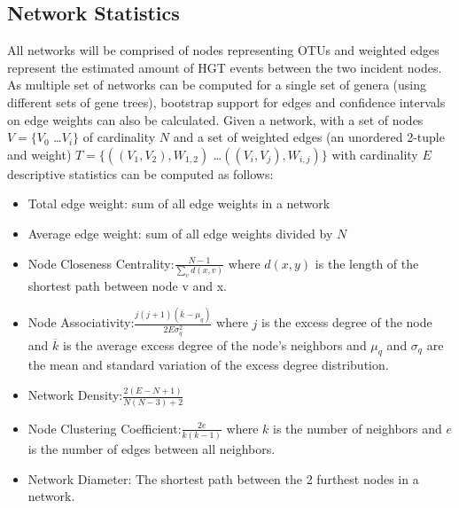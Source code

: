 \documentclass[12pt,letter]{article}
\begin{document}
\subsection{Network Statistics}
All networks will be comprised of nodes representing OTUs and weighted edges represent the estimated amount of HGT events between the two incident nodes.
As multiple set of networks can be computed for a single set of genera (using different sets of gene trees), bootstrap support for edges and confidence intervals on edge weights can also be calculated.
Given a network, with a set of nodes $V = \{V_0$ \dots $V_i\}$ of cardinality $N$ and a set of weighted edges (an unordered 2-tuple and weight) $T = \{((V_1,V_2),W_{1,2})$ \dots $((V_i,V_j),W_{i,j})\}$ with cardinality $E$ descriptive statistics can be computed as follows:
\begin{itemize}
    \item Total edge weight: sum of all edge weights in a network
    \item Average edge weight: sum of all edge weights divided by $N$
    \item Node Closeness Centrality:$ \frac{N-1}{\sum_v d(x,v)}$ where $d(x,y)$ is the length of the shortest path between node v and x.
    \item Node Associativity:$ \frac{j(j+1)(\overline{k}-\mu_q)}{2E\sigma^2_q}$ where $j$ is the excess degree of the node and $\overline{k}$ is the average excess degree of the node's neighbors and $\mu_q$ and $\sigma_q$ are the mean and standard variation of the excess degree distribution.
    \item Network Density:$ \frac{2(E-N+1)}{N(N-3)+2}$
    \item Node Clustering Coefficient:$ \frac{2e}{k(k-1)}$ where $k$ is the number of neighbors and $e$ is the number of edges between all neighbors.
    \item Network Diameter: The shortest path between the 2 furthest nodes in a network.
\end{itemize}
\printbibliography
\end{document}
